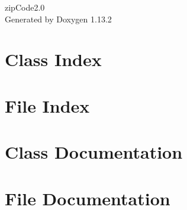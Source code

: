 \documentclass[twoside]{book}
\newcommand{\+}{\discretionary{\mbox{\scriptsize$\hookleftarrow$}}{}{}}
\newcommand{\clearemptydoublepage}{%
    \newpage{\pagestyle{empty}\cleardoublepage}%
  }
\begin{document}
  \raggedbottom
    \hypersetup{pageanchor=false,
                bookmarksnumbered=true,
                pdfencoding=unicode
               }
  \begin{titlepage}
  \vspace*{7cm}
  \begin{center}%
  {\Large zip\+Code2.\+0}\\
  \vspace*{1cm}
  {\large Generated by Doxygen 1.13.2}\\
  \end{center}
  \end{titlepage}
  \clearemptydoublepage
  \tableofcontents
  \clearemptydoublepage
  \hypersetup{pageanchor=true}

\chapter{Class Index}

\chapter{File Index}

\chapter{Class Documentation}




\chapter{File Documentation}









  \backmatter
  \newpage
  \clearemptydoublepage
  \printindex
\end{document}
